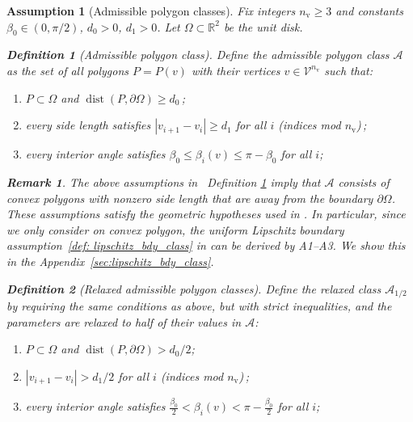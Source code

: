 \documentclass{article}
\newcommand{\R}{\mathbb{R}}
\newtheorem{assumption}[theorem]{Assumption}
\newtheorem{definition}{Definition}[section]
\newtheorem{remark}{Remark}[section]
\newcommand{\dist}{\operatorname{dist}}
\begin{document}
\begin{assumption}[Admissible polygon classes]\label{ass:admissible_poly}
Fix integers $n_{\mathrm v}\ge 3$ and constants $\beta_0\in(0,\pi/2)$, $d_0>0$, $d_1>0$.
Let $\Omega\subset\R^2$ be the unit disk.
\begin{definition}[Admissible polygon class]\label{def:admiss}
Define the \emph{admissible polygon class} $\mathcal A$ as the set of all polygons $P=P(v)$ with their vertices $v\in\mathcal V^{n_{\mathrm v}}$
such that:
\begin{enumerate}
\item[(A1)] $P\subset\Omega$ and $\dist(P,\partial\Omega)\ge d_0$\,;
\item[(A2)] every side length satisfies $|v_{i+1}-v_i|\ge d_1$ for all $i$ (indices mod $n_{\mathrm v}$)\,;
\item[(A3)] every interior angle satisfies $\beta_0\le \beta_i(v)\le \pi-\beta_0$ for all $i$; 
\end{enumerate}
\end{definition}
\begin{remark}
    The above assumptions in ~Definition \ref{def:admiss} imply that $\mathcal{A}$ consists of convex polygons with nonzero side length that are away from the boundary $\partial\Omega$.
    These assumptions satisfy the geometric hypotheses used in \citealp[Prop.~3.3]{beretta2022global}. In particular, since we only consider on convex polygon, the uniform Lipschitz boundary assumption~\ref{def: lipschitz_bdy_class} in \citealp[Prop.~3.3]{beretta2022global} can be derived by A1--A3. We show this in the Appendix~\ref{sec:lipschitz_bdy_class}. 
\end{remark}
\begin{definition}[Relaxed admissible polygon classes]
Define the \emph{relaxed class} $\mathcal A_{1/2}$ by requiring the same conditions as above,
but with \emph{strict} inequalities, and the parameters are relaxed to half of their values in $\mathcal{A}$:
\begin{enumerate}
\item[(A1$'$)] $P\subset\Omega$ and $\dist(P,\partial\Omega) > d_0/2$;
\item[(A2$'$)] $|v_{i+1}-v_i| > d_1/2$ for all $i$ (indices mod $n_{\mathrm v}$)\,;
\item[(A3$'$)] every interior angle satisfies $\frac{\beta_0}{2}< \beta_i(v)< \pi-\frac{\beta_0}{2}$ for all $i$;
\end{enumerate}
\end{definition}
\end{assumption}
\end{document}
